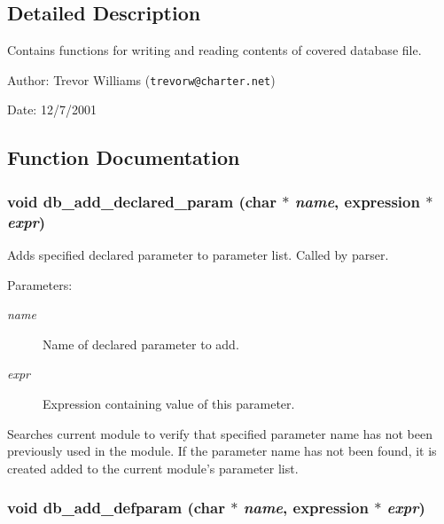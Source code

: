 \subsection{Detailed Description}
Contains functions for writing and reading contents of covered database file.

\begin{Desc}
\item[Author:]Trevor Williams ({\tt trevorw@charter.net}) \end{Desc}
\begin{Desc}
\item[Date:]12/7/2001 \end{Desc}


\subsection{Function Documentation}
\subsubsection{\setlength{\rightskip}{0pt plus 5cm}void db\_\-add\_\-declared\_\-param (char $\ast$ {\em name}, {\bf expression} $\ast$ {\em expr})}\label{db_8h_a4}


Adds specified declared parameter to parameter list. Called by parser.

\begin{Desc}
\item[Parameters:]
\begin{description}
\item[{\em name}]Name of declared parameter to add. \item[{\em expr}]Expression containing value of this parameter.\end{description}
\end{Desc}
Searches current module to verify that specified parameter name has not been previously used in the module. If the parameter name has not been found, it is created added to the current module's parameter list. 
\subsubsection{\setlength{\rightskip}{0pt plus 5cm}void db\_\-add\_\-defparam (char $\ast$ {\em name}, {\bf expression} $\ast$ {\em expr})}\label{db_8h_a7}


